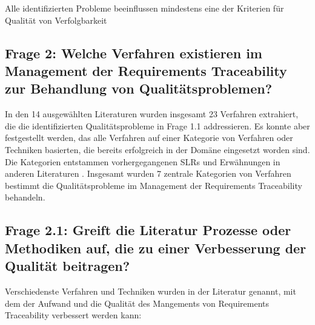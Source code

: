 Alle identifizierten Probleme beeinflussen mindestens eine der Kriterien für Qualität von Verfolgbarkeit


\subsection{Frage 2: Welche Verfahren existieren im Management der Requirements Traceability zur Behandlung von Qualitätsproblemen?}

In den 14 ausgewählten Literaturen wurden insgesamt 23 Verfahren extrahiert, die die identifizierten Qualitätsprobleme in Frage 1.1 addressieren. Es konnte aber festgestellt werden, das alle Verfahren auf einer Kategorie von Verfahren oder Techniken basierten, die bereits erfolgreich in der Domäne eingesetzt worden sind. Die Kategorien entstammen vorhergegangenen SLRs und Erwähnungen in anderen Literaturen \cite{Tsuchiya2015InteractiveLogs, Omoronyia2011ExploringTraceability, Leuser2010TacklingSpecifications, Spanoudakis2004Rule-basedRelations}. Insgesamt wurden 7 zentrale Kategorien von Verfahren bestimmt die Qualitätsprobleme im Management der Requirements Traceability behandeln.

\subsection{Frage 2.1: Greift die Literatur Prozesse oder Methodiken auf, die zu einer Verbesserung der Qualität beitragen?}

Verschiedenste Verfahren und Techniken wurden in der Literatur genannt, mit dem der Aufwand und die Qualität des Mangements von Requirements Traceability verbessert werden kann:

